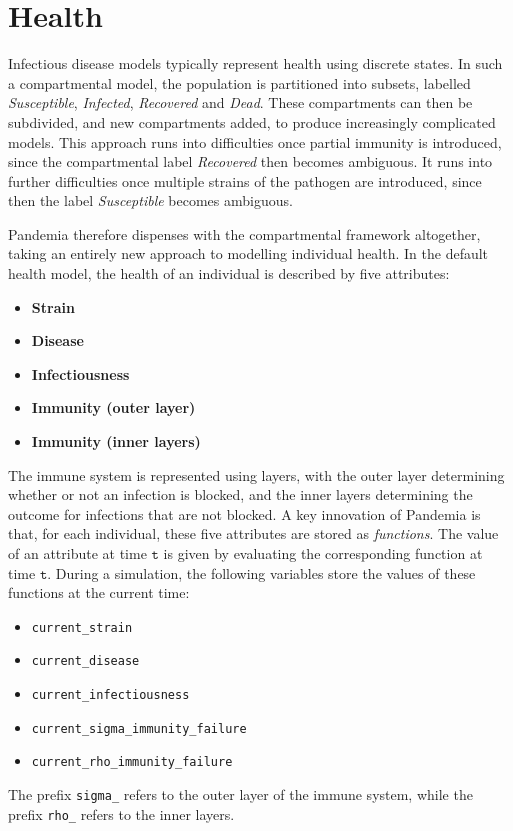 \documentclass[10pt,letterpaper]{article}
\begin{document}
\section{Health}\label{sec:health}

Infectious disease models typically represent health using discrete states. In such a compartmental model, the population is partitioned into subsets, labelled \textit{Susceptible}, \textit{Infected}, \textit{Recovered} and \textit{Dead}. These compartments can then be subdivided, and new compartments added, to produce increasingly complicated models. This approach runs into difficulties once partial immunity is introduced, since the compartmental label \textit{Recovered} then becomes ambiguous. It runs into further difficulties once multiple strains of the pathogen are introduced, since then the label \textit{Susceptible} becomes ambiguous.

Pandemia therefore dispenses with the compartmental framework altogether, taking an entirely new approach to modelling individual health. In the default health model, the health of an individual is described by five attributes:
\begin{itemize}
\item \textbf{Strain}
\item \textbf{Disease}
\item \textbf{Infectiousness}
\item \textbf{Immunity (outer layer)}
\item \textbf{Immunity (inner layers)}
\end{itemize}
The immune system is represented using layers, with the outer layer determining whether or not an infection is blocked, and the inner layers determining the outcome for infections that are not blocked. A key innovation of Pandemia is that, for each individual, these five attributes are stored as \textit{functions}. The value of an attribute at time $\texttt{t}$ is given by evaluating the corresponding function at time $\texttt{t}$. During a simulation, the following variables store the values of these functions at the current time:
\begin{itemize}
\item \texttt{current{\_}strain}
\item \texttt{current{\_}disease}
\item \texttt{current{\_}infectiousness}
\item \texttt{current{\_}sigma{\_}immunity{\_}failure}
\item \texttt{current{\_}rho{\_}immunity{\_}failure}
\end{itemize}
The prefix \texttt{sigma{\_}} refers to the outer layer of the immune system, while the prefix \texttt{rho{\_}} refers to the inner layers.
\end{document}
